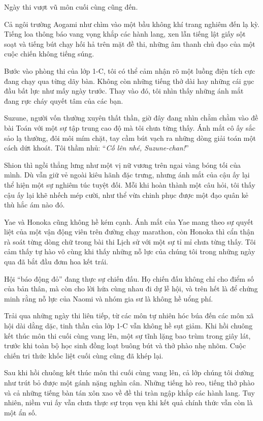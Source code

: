 \documentclass[../main.tex]{subfiles}
\begin{document}

Ngày thi vượt vũ môn cuối cùng cũng đến.

Cả ngôi trường Aogami như chìm vào một bầu không khí trang nghiêm đến lạ kỳ. Tiếng loa thông báo vang vọng khắp các hành lang, xen lẫn tiếng lật giấy sột soạt và tiếng bút chạy hối hả trên mặt đề thi, những âm thanh chủ đạo của một cuộc chiến không tiếng súng.

Bước vào phòng thi của lớp 1-C, tôi có thể cảm nhận rõ một luồng điện tích cực đang chạy qua từng dãy bàn. Không còn những tiếng thở dài hay những cái gục đầu bất lực như mấy ngày trước. Thay vào đó, tôi nhìn thấy những ánh mắt đang rực cháy quyết tâm của các bạn.

Suzune, người vốn thường xuyên thất thần, giờ đây đang nhìn chằm chằm vào đề bài Toán với một sự tập trung cao độ mà tôi chưa từng thấy. Ánh mắt cô ấy sắc sảo lạ thường, đôi môi mím chặt, tay cầm bút vạch ra những dòng giải toán một cách dứt khoát. Tôi thầm nhủ: ``\textit{Cố lên nhé, Suzune-chan!}''

Shion thì ngồi thẳng lưng như một vị nữ vương trên ngai vàng bóng tối của mình. Dù vẫn giữ vẻ ngoài kiêu hãnh đặc trưng, nhưng ánh mắt của cậu ấy lại thể hiện một sự nghiêm túc tuyệt đối. Mỗi khi hoàn thành một câu hỏi, tôi thấy cậu ấy lại khẽ nhếch mép cười, như thể vừa chinh phục được một đạo quân kẻ thù hắc ám nào đó.

Yae và Honoka cũng không hề kém cạnh. Ánh mắt của Yae mang theo sự quyết liệt của một vận động viên trên đường chạy marathon, còn Honoka thì cẩn thận rà soát từng dòng chữ trong bài thi Lịch sử với một sự tỉ mỉ chưa từng thấy. Tôi cảm thấy tự hào vô cùng khi thấy những nỗ lực của chúng tôi trong những ngày qua đã bắt đầu đơm hoa kết trái.

Hội ``báo động đỏ'' đang thực sự chiến đấu. Họ chiến đấu không chỉ cho điểm số của bản thân, mà còn cho lời hứa cùng nhau đi dự lễ hội, và trên hết là để chứng minh rằng nỗ lực của Naomi và nhóm gia sư là không hề uổng phí.

Trải qua những ngày thi liên tiếp, từ các môn tự nhiên hóc búa đến các môn xã hội dài dằng dặc, tinh thần của lớp 1-C vẫn không hề sụt giảm. Khi hồi chuông kết thúc môn thi cuối cùng vang lên, một sự tĩnh lặng bao trùm trong giây lát, trước khi toàn bộ học sinh đồng loạt buông bút và thở phào nhẹ nhõm. Cuộc chiến tri thức khốc liệt cuối cùng cũng đã khép lại.

Sau khi hồi chuông kết thúc môn thi cuối cùng vang lên, cả lớp chúng tôi dường như trút bỏ được một gánh nặng nghìn cân. Những tiếng hò reo, tiếng thở phào và cả những tiếng bàn tán xôn xao về đề thi tràn ngập khắp các hành lang. Tuy nhiên, niềm vui ấy vẫn chưa thực sự trọn vẹn khi kết quả chính thức vẫn còn là một ẩn số.
\end{document}

